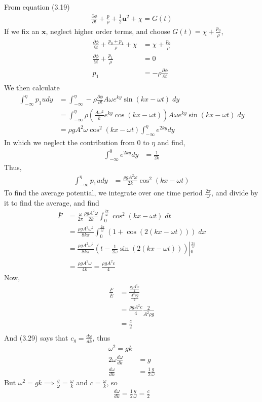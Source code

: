 \documentclass[12pt]{article}
\newcommand{\eq}[1]{\begin{align*}#1\end{align*}}
\newcommand{\p}[2]{\frac{\partial#1}{\partial#2}}
\begin{document}
From equation (3.19)
\eq{
	\p{\phi}{t} + \frac{p}{\rho} + \frac{1}{2}\bm{u}^2 + \chi = G(t)
}
If we fix an $\bm{x}$, neglect higher order terms, and choose $G(t) = \chi + \frac{p_0}{\rho}$,
\eq{
	\p{\phi}{t} + \frac{p_0 + p_1}{\rho} + \chi &= \chi + \frac{p_0}{\rho}\\
	\p{\phi}{t} + \frac{p_1}{\rho} &= 0\\
	p_1 &= -\rho\p{\phi}{t}\\
}
We then calculate
\eq{
	\int_{-\infty}^\eta p_1 u dy &= \int_{-\infty}^{\eta} -\rho\p{\phi}{t} A\omega e^{ky}\sin(kx - \omega t) \; dy\\
	&= \int_{-\infty}^{\eta} \rho(\frac{A\omega^2}{k}e^{ky}\cos(kx-\omega t)) A\omega e^{ky}\sin(kx - \omega t) \; dy\\
	&= \rho g A^2\omega\cos^2(kx - \omega t)\int_{-\infty}^\eta e^{2ky}dy
}
In which we neglect the contribution from $0$ to $\eta$ and find,
\eq{
	\int_{-\infty}^0 e^{2ky}dy &= \frac{1}{2k}
}
Thus,
\eq{
	\int_{-\infty}^\eta p_1 u dy &= \frac{\rho g A^2\omega}{2k}\cos^2(kx - \omega t)
}
To find the average potential, we integrate over one time period $\frac{2\pi}{\omega}$, and divide by it to find the average, and find
\eq{
	\bar{F} &= \frac{\omega}{2\pi} \frac{\rho g A^2\omega}{2k}\int_{0}^{\frac{2\pi}{\omega}} \cos^2(kx - \omega t) \; dt\\
	&= \frac{\rho g A^2\omega^2}{8k\pi}\int_{0}^{\frac{2\pi}{\omega}} (1 + \cos(2(kx - \omega t))) \; dx\\
	&= \frac{\rho g A^2\omega^2}{8k\pi}(t - \frac{1}{2\omega}\sin(2(kx - \omega t)))\left|_{0}^{\frac{2\pi}{\omega}}\right.\\
	&= \frac{\rho g A^2\omega}{4k} = \frac{\rho g A^2 c}{4}
}
Now,
\eq{
	\frac{\bar{F}}{\bar{E}} &= \frac{\frac{\rho g A^2 c}{4}}{\frac{A^2\rho g}{2}}\\
	&= \frac{\rho g A^2 c}{4}\frac{2}{A^2\rho g}\\
	&= \frac{c}{2}\\
}
And (3.29) says that $c_g = \frac{d\omega}{dk}$, thus
\eq{
	\omega^2 = gk\\
	2\omega\frac{d\omega}{dk} &= g\\
	\frac{d\omega}{dk} &= \frac{1}{2}\frac{g}{\omega}
}
But $\omega^2 = gk \implies \frac{g}{\omega} = \frac{\omega}{k}$ and $c = \frac{\omega}{k}$, so
\eq{
	\frac{d\omega}{dk} = \frac{1}{2}\frac{g}{\omega} = \frac{c}{2}
}
\end{document}

